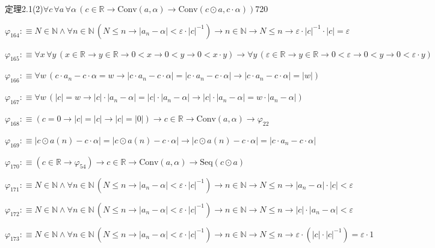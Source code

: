 \begin{fullproof}{定理2.1(2)}{$\forall c\,\forall a\,\forall \alpha\,(c \in \mathbb{R} \to \mathrm{Conv}(a,\alpha) \to \mathrm{Conv}(c \odot a,c \cdot \alpha))$}{720}
\begin{abbrevlist}
\item $\varphi_{164} :\equiv N \in \mathbb{N} \land \forall n \in \mathbb{N}\,(N \leq n \to \lvert a_{n} - \alpha \rvert < \varepsilon \cdot \lvert c \rvert^{-1}) \to n \in \mathbb{N} \to N \leq n \to \varepsilon \cdot \lvert c \rvert^{-1} \cdot \lvert c \rvert = \varepsilon$
\item $\varphi_{165} :\equiv \forall x\,\forall y\,(x \in \mathbb{R} \to y \in \mathbb{R} \to 0 < x \to 0 < y \to 0 < x \cdot y) \to \forall y\,(\varepsilon \in \mathbb{R} \to y \in \mathbb{R} \to 0 < \varepsilon \to 0 < y \to 0 < \varepsilon \cdot y)$
\item $\varphi_{166} :\equiv \forall w\,(c \cdot a_{n} - c \cdot \alpha = w \to \lvert c \cdot a_{n} - c \cdot \alpha \rvert = \lvert c \cdot a_{n} - c \cdot \alpha \rvert \to \lvert c \cdot a_{n} - c \cdot \alpha \rvert = \lvert w \rvert)$
\item $\varphi_{167} :\equiv \forall w\,(\lvert c \rvert = w \to \lvert c \rvert \cdot \lvert a_{n} - \alpha \rvert = \lvert c \rvert \cdot \lvert a_{n} - \alpha \rvert \to \lvert c \rvert \cdot \lvert a_{n} - \alpha \rvert = w \cdot \lvert a_{n} - \alpha \rvert)$
\item $\varphi_{168} :\equiv (c = 0 \to \lvert c \rvert = \lvert c \rvert \to \lvert c \rvert = \lvert 0 \rvert) \to c \in \mathbb{R} \to \mathrm{Conv}(a,\alpha) \to \varphi_{22}$
\item $\varphi_{169} :\equiv \lvert c \odot a(n) - c \cdot \alpha \rvert = \lvert c \odot a(n) - c \cdot \alpha \rvert \to \lvert c \odot a(n) - c \cdot \alpha \rvert = \lvert c \cdot a_{n} - c \cdot \alpha \rvert$
\item $\varphi_{170} :\equiv (c \in \mathbb{R} \to \varphi_{54}) \to c \in \mathbb{R} \to \mathrm{Conv}(a,\alpha) \to \mathrm{Seq}(c \odot a)$
\item $\varphi_{171} :\equiv N \in \mathbb{N} \land \forall n \in \mathbb{N}\,(N \leq n \to \lvert a_{n} - \alpha \rvert < \varepsilon \cdot \lvert c \rvert^{-1}) \to n \in \mathbb{N} \to N \leq n \to \lvert a_{n} - \alpha \rvert \cdot \lvert c \rvert < \varepsilon$
\item $\varphi_{172} :\equiv N \in \mathbb{N} \land \forall n \in \mathbb{N}\,(N \leq n \to \lvert a_{n} - \alpha \rvert < \varepsilon \cdot \lvert c \rvert^{-1}) \to n \in \mathbb{N} \to N \leq n \to \lvert c \rvert \cdot \lvert a_{n} - \alpha \rvert < \varepsilon$
\item $\varphi_{173} :\equiv N \in \mathbb{N} \land \forall n \in \mathbb{N}\,(N \leq n \to \lvert a_{n} - \alpha \rvert < \varepsilon \cdot \lvert c \rvert^{-1}) \to n \in \mathbb{N} \to N \leq n \to \varepsilon \cdot (\lvert c \rvert \cdot \lvert c \rvert^{-1}) = \varepsilon \cdot 1$

\end{abbrevlist}
\end{fullproof}
